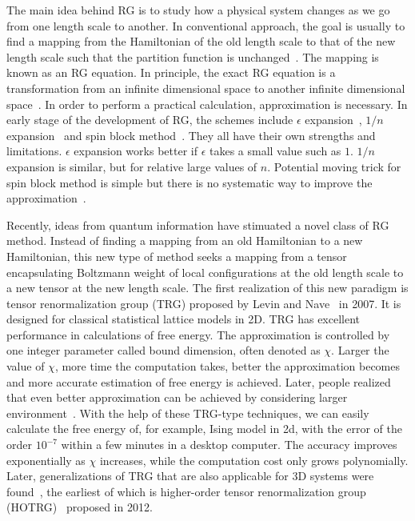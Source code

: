 \documentclass[aps,prb,reprint,superscriptaddress]{revtex4-2}
\begin{document}
The main idea behind RG is to study how a physical system changes as we
go from one length scale to another. In conventional approach, the
goal is usually to find a mapping from the Hamiltonian of the
old length scale to that of the new length scale such that the partition
function is unchanged~\cite{nonlinearRG}. The mapping is known as an RG
equation. In principle, the exact RG equation is a transformation from
an infinite dimensional space to another infinite dimensional
space~\cite{wilsonNobel,wilson1970a}. In order to perform a practical
calculation, approximation is necessary. In early stage of the
development of RG, the schemes include $\epsilon$
expansion~\cite{wilson1972}, $1/n$ expansion~\cite{largeNexp} and spin
block
method~\cite{kadanoff1966,kadanoff1975,migdal,kadanoff1976,niemeijer1973}.
They all have their own strengths and limitations. $\epsilon$ expansion
works better if $\epsilon$ takes a small value such as $1$. $1/n$
expansion is similar, but for relative large values of $n$. Potential
moving trick for spin block method is simple but there is no systematic
way to improve the approximation~\cite{kardar2007}.
%

Recently, ideas from quantum information have stimuated a novel class of
RG method. Instead of finding a mapping from an old Hamiltonian to a new
Hamiltonian, this new type of method seeks a mapping from a tensor
encapsulating Boltzmann weight of local configurations at the old length
scale to a new tensor at the new length scale. The first realization of
this new paradigm is tensor renormalization group (TRG) proposed by
Levin and Nave~\cite{trg} in 2007. It is designed for classical
statistical lattice models in 2D.
TRG has excellent performance in calculations of free energy. The
approximation is controlled by one integer parameter called bound
dimension, often denoted as $\chi$. Larger the value of $\chi$, more
time the computation takes, better the approximation becomes and more
accurate estimation of free energy is achieved. Later, people realized
that even better approximation can be achieved by considering larger
environment~\cite{SRGa,SRGb,hotrg,morita2020global}. With the help of
these TRG-type techniques, we can easily calculate the free energy of,
for example, Ising model in 2d, with the error of the order $10^{-7}$
within a few minutes in a desktop computer. The accuracy improves
exponentially as $\chi$ increases, while the computation cost only grows
polynomially. Later, generalizations of TRG that are also applicable for
3D systems were found~\cite{hotrg,atrg,triadtrg}, the earliest of which
is higher-order tensor renormalization group (HOTRG)~\cite{hotrg}
proposed in 2012.
%
\end{document}
